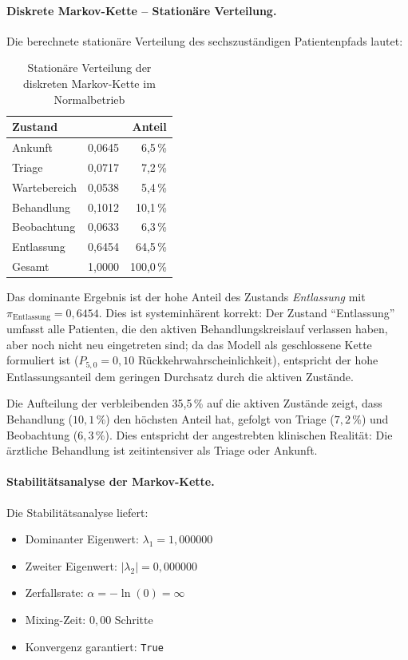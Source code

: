 ﻿\documentclass[a4paper,12pt]{scrreprt}
\theoremstyle{definition}
\begin{document}
\paragraph{Diskrete Markov-Kette -- Stationäre Verteilung.}
Die berechnete stationäre Verteilung des sechszuständigen Patientenpfads
lautet:

\begin{table}[H]
	\centering
	\begin{tabular}{@{}lrr@{}}
		\toprule
		\textbf{Zustand} & \boldmath{$\pi_i$} & \textbf{Anteil} \\
		\midrule
		Ankunft     & 0{,}0645 &  6{,}5\,\% \\
		Triage      & 0{,}0717 &  7{,}2\,\% \\
		Wartebereich& 0{,}0538 &  5{,}4\,\% \\
		Behandlung  & 0{,}1012 & 10{,}1\,\% \\
		Beobachtung & 0{,}0633 &  6{,}3\,\% \\
		Entlassung  & 0{,}6454 & 64{,}5\,\% \\
		\midrule
		Gesamt      & 1{,}0000 & 100{,}0\,\% \\
		\bottomrule
	\end{tabular}
	\caption{Stationäre Verteilung der diskreten Markov-Kette im Normalbetrieb}
	\label{tab:pi-normal}
\end{table}

Das dominante Ergebnis ist der hohe Anteil des Zustands \emph{Entlassung}
mit $\pi_\text{Entlassung} = 0{,}6454$. Dies ist systeminhärent korrekt:
Der Zustand ``Entlassung'' umfasst alle Patienten, die den aktiven
Behandlungskreislauf verlassen haben, aber noch nicht neu eingetreten sind;
da das Modell als geschlossene Kette formuliert ist ($P_{5,0} = 0{,}10$
Rückkehrwahrscheinlichkeit), entspricht der hohe Entlassungsanteil
dem geringen Durchsatz durch die aktiven Zustände.

Die Aufteilung der verbleibenden 35{,}5\,\% auf die aktiven Zustände
zeigt, dass Behandlung ($10{,}1\,\%$) den höchsten Anteil hat, gefolgt
von Triage ($7{,}2\,\%$) und Beobachtung ($6{,}3\,\%$). Dies entspricht
der angestrebten klinischen Realität: Die ärztliche Behandlung ist
zeitintensiver als Triage oder Ankunft.

\paragraph{Stabilitätsanalyse der Markov-Kette.}
Die Stabilitätsanalyse liefert:
\begin{itemize}
	\item[-] Dominanter Eigenwert: $\lambda_1 = 1{,}000000$
	\item[-] Zweiter Eigenwert: $|\lambda_2| = 0{,}000000$
	\item[-] Zerfallsrate: $\alpha = -\ln(0) = \infty$
	\item[-] Mixing-Zeit: $0{,}00$ Schritte
	\item[-] Konvergenz garantiert: \texttt{True}
\end{itemize}
\end{document}
